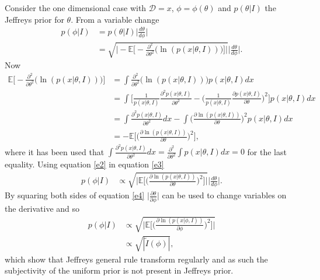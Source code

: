 \begin{example}
	Consider the one dimensional case with $\mathcal{D}=x$, $\phi=\phi(\theta)$ and $p(\theta|I)$ the Jeffreys prior for $\theta$. From a variable change
	\begin{equation}
		\begin{split}
			p(\phi|I)&=p(\theta|I)\bigg|\frac{d\theta}{d\phi}\bigg|\\
			&=\sqrt{\bigg|-\mathbb{E}\bigg[-\frac{\partial^2}{\partial \theta^2}\bigg(\ln(p(x|\theta,I))\bigg)\bigg]\bigg|}\bigg|\frac{d\theta}{d\phi}\bigg|.
		\end{split}
		\label{e3}
	\end{equation}
	Now
	\begin{equation}
		\begin{split}
			\mathbb{E}\bigg[-\frac{\partial^2}{\partial \theta^2}\bigg(\ln(p(x|\theta,I))\bigg)\bigg]&=\int \frac{\partial^2}{\partial\theta^2}\bigg(\ln(p(x|\theta,I))\bigg)p(x|\theta,I)dx\\
			&=\int \bigg[\frac{1}{p(x|\theta,I)}\frac{\partial^2p(x|\theta,I)}{\partial\theta^2}-\bigg(\frac{1}{p(x|\theta,I)}\frac{\partial p(x|\theta,I)}{\partial\theta}\bigg)^2\bigg]p(x|\theta,I)dx\\
			&=\int \frac{\partial^2p(x|\theta,I)}{\partial\theta^2}dx-\int\bigg(\frac{\partial\ln(p(x|\theta,I))}{\partial\theta}\bigg)^2p(x|\theta,I)dx\\
			&=-\mathbb{E}\bigg[\bigg(\frac{\partial\ln(p(x|\theta,I))}{\partial\theta}\bigg)^2\bigg],
		\end{split}
		\label{e2}
	\end{equation}
	where it has been used that $\int \frac{\partial^2p(x|\theta,I)}{\partial\theta^2}dx=\frac{\partial^2}{\partial\theta^2}\int p(x|\theta,I)dx=0$ for the last equality. Using equation \eqref{e2} in equation \eqref{e3}
	\begin{equation}
		\begin{split}
			p(\phi|I)&\propto \sqrt{\bigg|\mathbb{E}\bigg[\bigg(\frac{\partial\ln(p(x|\theta,I))}{\partial\theta}\bigg)^2\bigg]\bigg|}\bigg|\frac{d\theta}{d\phi}\bigg|.
		\end{split}
		\label{e4}
	\end{equation}
	By squaring both sides of equation \eqref{e4} $\big|\frac{\partial\theta}{\partial\phi}\big|$ can be used to change variables on the derivative and so
	\begin{equation}
		\begin{split}
			p(\phi|I)&\propto \sqrt{\bigg|\mathbb{E}\bigg[\bigg(\frac{\partial\ln(p(x|\phi,I))}{\partial\phi}\bigg)^2\bigg]\bigg|}\\
			&\propto \sqrt{|\tilde{I}(\phi)|},
		\end{split}
		\label{e5}
	\end{equation}
	which show that Jeffreys general rule transform regularly and as such the subjectivity of the uniform prior is not present in Jeffreys prior.
\end{example}

